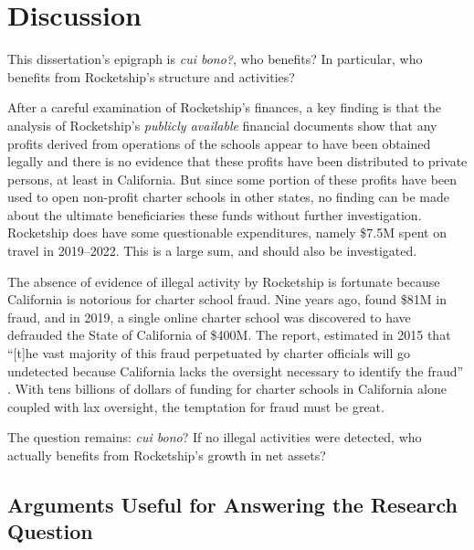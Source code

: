 
\chapter{Discussion}\label{ch:discussion}\indent%

This dissertation's epigraph is \textit{cui bono?}, who benefits? In particular, who benefits from Rocketship's structure 
and activities?

After a careful examination of Rocketship's finances, a key finding is that the analysis of Rocketship's \textit{publicly available} financial documents show that any profits derived from operations of the schools appear to have been obtained legally and there is no evidence that these profits have been distributed to private persons, at least in California. But since some portion of these profits have been used to open non-profit charter schools in other states, no finding can be made about the ultimate beneficiaries these funds without further investigation. Rocketship does have some questionable expenditures, namely \$7.5M spent on travel in 2019–2022. This is a large sum, and should also be investigated.

The absence of evidence of illegal activity by Rocketship is fortunate because California is notorious for charter school fraud. Nine years ago, \textcite{CPD2015} found \$81M in fraud, and in 2019, a single online charter school was discovered to have defrauded the State of California of \$400M. The report,  estimated in 2015 that ``[t]he vast majority of this fraud perpetuated by charter officials will go undetected because California lacks the oversight necessary to identify the fraud'' \parencite[2]{CPD2015}. With tens billions of dollars of funding for charter schools in California alone coupled with lax oversight, the temptation for fraud must be great. 

The question remains: \textit{cui bono}? If no illegal activities were detected, who actually benefits from Rocketship's growth in net assets?

\section{Arguments Useful for Answering the Research Question}\label{sec:appr-answ-rese-quest}\indent

